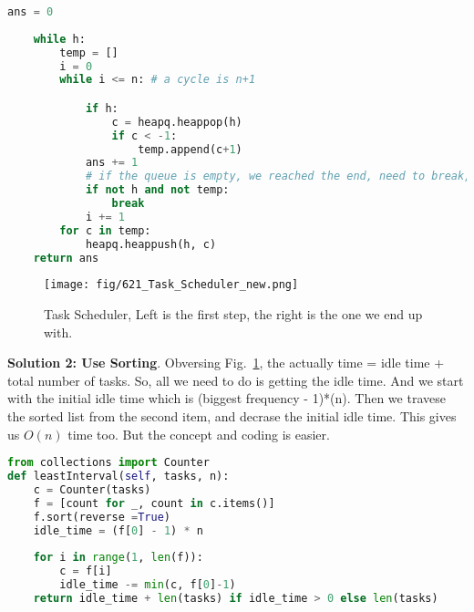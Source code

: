 \documentclass[../main.tex]{subfiles}
\begin{document}
\begin{examples}[resume]
\begin{lstlisting}[language=Python]
    ans = 0
        
    while h:
        temp = []
        i = 0
        while i <= n: # a cycle is n+1

            if h:
                c = heapq.heappop(h)
                if c < -1:
                    temp.append(c+1)
            ans += 1
            # if the queue is empty, we reached the end, need to break, no idle
            if not h and not temp:
                break
            i += 1
        for c in temp:
            heapq.heappush(h, c)
    return ans
\end{lstlisting}

\begin{figure}[h!]
    \centering
    \texttt{[image: fig/621\_Task\_Scheduler\_new.png]}
    \caption{Task Scheduler, Left is the first step, the right is the one we end up with.}
    \label{fig:task_scheduler}
\end{figure}
\textbf{Solution 2: Use Sorting}. Obversing Fig.~\ref{fig:task_scheduler}, the actually time = idle time + total number of tasks. So, all we need to do is getting the idle time. And we start with the initial idle time which is (biggest frequency - 1)*(n). Then we travese the sorted list from the second item, and decrase the initial idle time. This gives us $O(n)$ time too. But the concept and coding is easier. 
\begin{lstlisting}[language=Python]
from collections import Counter
def leastInterval(self, tasks, n):
    c = Counter(tasks)
    f = [count for _, count in c.items()]
    f.sort(reverse =True)
    idle_time = (f[0] - 1) * n
    
    for i in range(1, len(f)):
        c = f[i]
        idle_time -= min(c, f[0]-1)
    return idle_time + len(tasks) if idle_time > 0 else len(tasks)
\end{lstlisting}
\end{examples}
\end{document}
